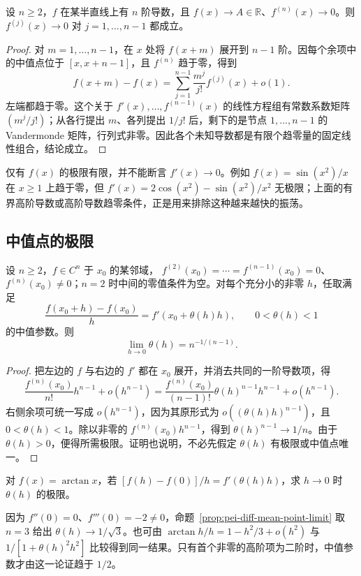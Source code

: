 \begin{proposition}
\label{prop:pei-diff-intermediate-derivative-limit}
设 $n\ge2$，$f$ 在某半直线上有 $n$ 阶导数，且 $f(x)\to A\in\mathbb R$、$f^{(n)}(x)\to0$。则 $f^{(j)}(x)\to0$ 对 $j=1,\ldots,n-1$ 都成立。
\end{proposition}
\begin{proof}
对 $m=1,\ldots,n-1$，在 $x$ 处将 $f(x+m)$ 展开到 $n-1$ 阶。因每个余项中的中值点位于 $[x,x+n-1]$，且 $f^{(n)}$ 趋于零，得到
\[
 f(x+m)-f(x)=\sum_{j=1}^{n-1}\frac{m^j}{j!}f^{(j)}(x)+o(1).
\]
左端都趋于零。这个关于 $f'(x),\ldots,f^{(n-1)}(x)$ 的线性方程组有常数系数矩阵 $(m^j/j!)$；从各行提出 $m$、各列提出 $1/j!$ 后，剩下的是节点 $1,\ldots,n-1$ 的 Vandermonde 矩阵，行列式非零。因此各个未知导数都是有限个趋零量的固定线性组合，结论成立。
\end{proof}

仅有 $f(x)$ 的极限有限，并不能断言 $f'(x)\to0$。例如 $f(x)=\sin(x^2)/x$ 在 $x\ge1$ 上趋于零，但 $f'(x)=2\cos(x^2)-\sin(x^2)/x^2$ 无极限；上面的有界高阶导数或高阶导数趋零条件，正是用来排除这种越来越快的振荡。

\subsection{中值点的极限}

\begin{proposition}
\label{prop:pei-diff-mean-point-limit}
设 $n\ge2$，$f\in C^n$ 于 $x_0$ 的某邻域，
$f^{(2)}(x_0)=\cdots=f^{(n-1)}(x_0)=0$、$f^{(n)}(x_0)\ne0$；$n=2$ 时中间的零值条件为空。对每个充分小的非零 $h$，任取满足
\[
 \frac{f(x_0+h)-f(x_0)}h=f'(x_0+\theta(h)h),
 \qquad 0<\theta(h)<1
\]
的中值参数。则
\[
 \lim_{h\to0}\theta(h)=n^{-1/(n-1)}.
\]
\end{proposition}
\begin{proof}
把左边的 $f$ 与右边的 $f'$ 都在 $x_0$ 展开，并消去共同的一阶导数项，得
\[
 \frac{f^{(n)}(x_0)}{n!}h^{n-1}+o(h^{n-1})
 =\frac{f^{(n)}(x_0)}{(n-1)!}\theta(h)^{n-1}h^{n-1}
  +o(h^{n-1}).
\]
右侧余项可统一写成 $o(h^{n-1})$，因为其原形式为 $o((\theta(h)h)^{n-1})$，且 $0<\theta(h)<1$。除以非零的 $f^{(n)}(x_0)h^{n-1}$，得到 $\theta(h)^{n-1}\to1/n$。由于 $\theta(h)>0$，便得所需极限。证明也说明，不必先假定 $\theta(h)$ 有极限或中值点唯一。
\end{proof}

\begin{example}
\label{ex:pei-diff-arctan-mean-point}
对 $f(x)=\arctan x$，若 $[f(h)-f(0)]/h=f'(\theta(h)h)$，求 $h\to0$ 时 $\theta(h)$ 的极限。
\end{example}
\begin{solve}
因为 $f''(0)=0$、$f'''(0)=-2\ne0$，命题~\ref{prop:pei-diff-mean-point-limit} 取 $n=3$ 给出 $\theta(h)\to1/\sqrt3$。也可由 $\arctan h/h=1-h^2/3+o(h^2)$ 与 $1/[1+\theta(h)^2h^2]$ 比较得到同一结果。只有首个非零的高阶项为二阶时，中值参数才由这一论证趋于 $1/2$。
\end{solve}

